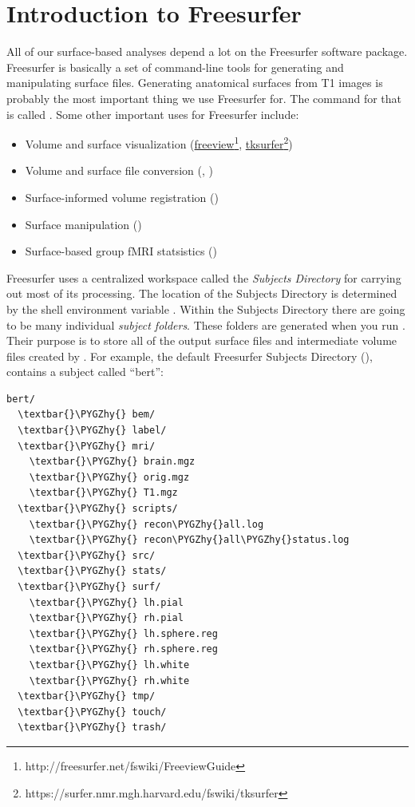 \documentclass[letterpaper,10pt,openany,oneside]{sphinxmanual}
\def\PYGZhy{\char`\-}
\begin{document}
\section{Introduction to Freesurfer}
\label{surface_reconstruction:introduction-to-freesurfer}
All of our surface-based analyses depend a lot on the Freesurfer software
package. Freesurfer is basically a set of command-line tools for generating and
manipulating surface files. Generating anatomical surfaces from T1 images is
probably the most important thing we use Freesurfer for. The command for that
is called . Some other important uses for Freesurfer include:
\begin{itemize}
\item {} 
Volume and surface visualization (\href{http://freesurfer.net/fswiki/FreeviewGuide}{freeview}\footnote{http://freesurfer.net/fswiki/FreeviewGuide}, \href{https://surfer.nmr.mgh.harvard.edu/fswiki/tksurfer}{tksurfer}\footnote{https://surfer.nmr.mgh.harvard.edu/fswiki/tksurfer})

\item {} 
Volume and surface file conversion (, )

\item {} 
Surface-informed volume registration ()

\item {} 
Surface manipulation ()

\item {} 
Surface-based group fMRI statsistics ()

\end{itemize}

Freesurfer uses a centralized workspace called the \emph{Subjects Directory} for
carrying out most of its processing. The location of the Subjects Directory is
determined by the shell environment variable . Within the
Subjects Directory there are going to be many individual \emph{subject folders}.
These folders are generated when you run . Their purpose is to
store all of the output surface files and intermediate volume files created by
. For example, the default Freesurfer Subjects Directory
(), contains a subject called ``bert'':

\begin{Verbatim}[commandchars=\\\{\}]
bert/
  \textbar{}\PYGZhy{} bem/
  \textbar{}\PYGZhy{} label/
  \textbar{}\PYGZhy{} mri/
    \textbar{}\PYGZhy{} brain.mgz
    \textbar{}\PYGZhy{} orig.mgz
    \textbar{}\PYGZhy{} T1.mgz
  \textbar{}\PYGZhy{} scripts/
    \textbar{}\PYGZhy{} recon\PYGZhy{}all.log
    \textbar{}\PYGZhy{} recon\PYGZhy{}all\PYGZhy{}status.log
  \textbar{}\PYGZhy{} src/
  \textbar{}\PYGZhy{} stats/
  \textbar{}\PYGZhy{} surf/
    \textbar{}\PYGZhy{} lh.pial
    \textbar{}\PYGZhy{} rh.pial
    \textbar{}\PYGZhy{} lh.sphere.reg
    \textbar{}\PYGZhy{} rh.sphere.reg
    \textbar{}\PYGZhy{} lh.white
    \textbar{}\PYGZhy{} rh.white
  \textbar{}\PYGZhy{} tmp/
  \textbar{}\PYGZhy{} touch/
  \textbar{}\PYGZhy{} trash/
\end{Verbatim}
\end{document}
